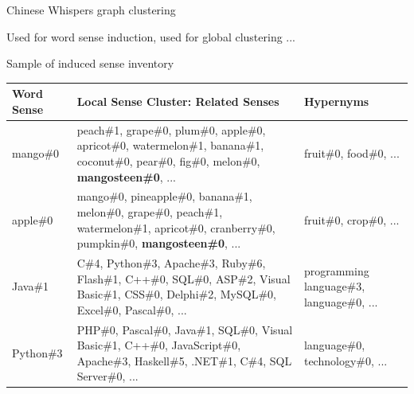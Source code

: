 \documentclass[usenames,dvipsnames,notes]{beamer}
\begin{document}
\begin{frame}{Chinese Whispers graph clustering}

Used for word sense induction, used for global clustering ... 

\end{frame}

	
\begin{frame}{Sample of induced sense inventory}


\begin{table}
\centering
\scriptsize
\begin{tabular}{l|p{6cm}|p{2.5cm}} 
\bf Word Sense & \bf Local Sense Cluster: Related Senses & \bf Hypernyms \\
\toprule
 mango\#0 &  peach\#1, grape\#0, plum\#0, apple\#0, apricot\#0, watermelon\#1, banana\#1, coconut\#0, pear\#0, fig\#0, melon\#0,  \textbf{mangosteen\#0}, ... & fruit\#0, food\#0, ... \\
 
\midrule
apple\#0 & mango\#0, pineapple\#0, banana\#1, melon\#0, grape\#0, peach\#1, watermelon\#1, apricot\#0, cranberry\#0, pumpkin\#0, \textbf{mangosteen\#0}, ... & fruit\#0, crop\#0,  ... \\

\midrule
Java\#1 & C\#4, Python\#3, Apache\#3, Ruby\#6, Flash\#1, C++\#0, SQL\#0, ASP\#2, Visual Basic\#1, CSS\#0, Delphi\#2, MySQL\#0, Excel\#0, Pascal\#0, ... & programming language\#3, language\#0, ... \\

\midrule
Python\#3 & PHP\#0, Pascal\#0, Java\#1, SQL\#0, Visual Basic\#1, C++\#0, JavaScript\#0, Apache\#3, Haskell\#5, .NET\#1, C\#4, SQL Server\#0, ... & language\#0, technology\#0, ... \\

\end{tabular}


\end{table}



\end{frame}
\end{document}
